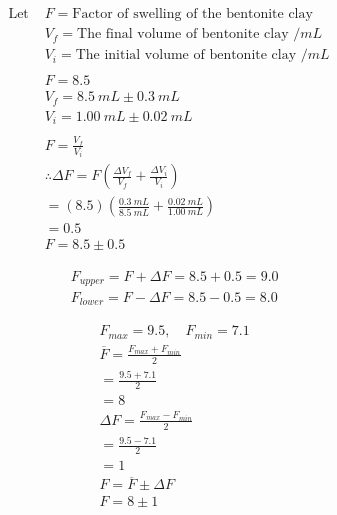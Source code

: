 \documentclass[11pt, letterpaper]{article}
\begin{document}
\begin{paracol}{2}



    \begin{align*}
        \text{Let } & F = \text{Factor of swelling of the bentonite clay}
        \\
                    & V_f = \text{The final volume of bentonite clay } /\unit{mL}
        \\
                    & V_i = \text{The initial volume of bentonite clay } /\unit{mL}
        \\
        \\
                    & F = 8.5
        \\
                    & V_f = \SI{8.5}{mL} \pm \SI{0.3}{mL}
        \\
                    & V_i = \SI{1.00}{mL} \pm \SI{0.02}{mL}
        \\
        \\
                    & F = \frac{V_f}{V_i}
        \\
                    & \therefore \Delta F = F\left( \frac{\Delta V_f}{V_f} + \frac{\Delta V_i}{V_i} \right)
        \\
                    & = (8.5)\left( \frac{\SI{0.3}{mL}}{\SI{8.5}{mL}} + \frac{\SI{0.02}{mL}}{\SI{1.00}{mL}} \right)
        \\
                    & = 0.5
        \\
                    & F = 8.5 \pm 0.5
    \end{align*}

    \switchcolumn



    \begin{align*}
         & F_{upper} = F + \Delta F = 8.5 + 0.5 = 9.0
        \\
         & F_{lower} = F - \Delta F = 8.5 - 0.5 = 8.0
    \end{align*}



    \begin{align*}
         & F_{max} = 9.5,\quad F_{min} = 7.1
        \\
         & \overline{F} = \frac{F_{max} + F_{min}}{2}
        \\
         & = \frac{9.5 + 7.1}{2}
        \\
         & = 8
        \\
         & \Delta F = \frac{F_{max} - F_{min}}{2}
        \\
         & = \frac{9.5 - 7.1}{2}
        \\
         & = 1
        \\
         & F = \overline{F} \pm \Delta F
        \\
         & F = 8 \pm 1
    \end{align*}

\end{paracol}
\end{document}
